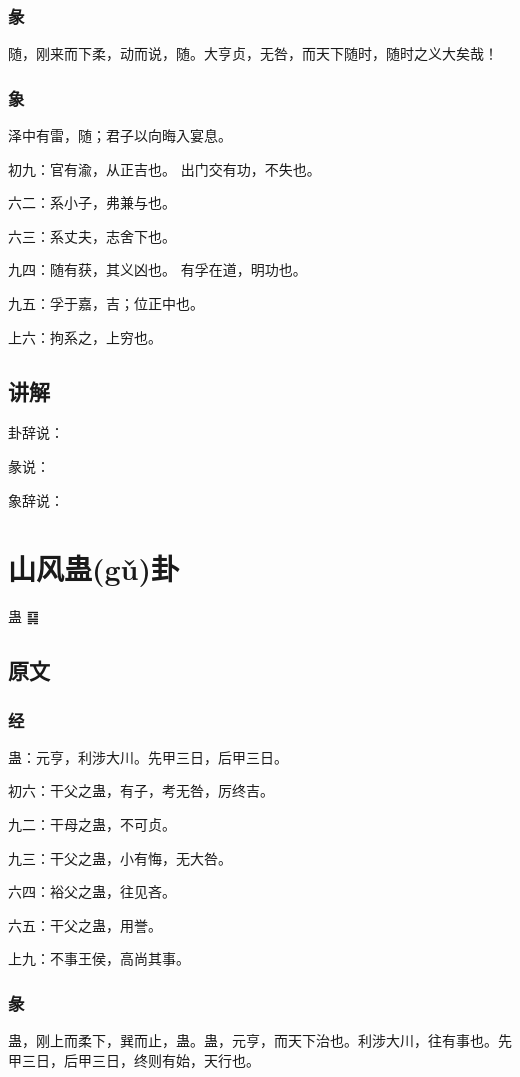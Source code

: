 \documentclass[12pt,oneside]{book}
\begin{document}
\subsection{彖}
随，刚来而下柔，动而说，随。大亨贞，无咎，而天下随时，随时之义大矣哉！

\subsection{象}
泽中有雷，随；君子以向晦入宴息。

初九：官有渝，从正吉也。 出门交有功，不失也。

六二：系小子，弗兼与也。

六三：系丈夫，志舍下也。

九四：随有获，其义凶也。 有孚在道，明功也。

九五：孚于嘉，吉；位正中也。

上六：拘系之，上穷也。

\section{讲解}
卦辞说：

彖说：

象辞说：



\chapter{山风蛊(gǔ)卦}
蛊 {\Large ䷑}

\section{原文}

\subsection{经}
蛊：元亨，利涉大川。先甲三日，后甲三日。

初六：干父之蛊，有子，考无咎，厉终吉。

九二：干母之蛊，不可贞。

九三：干父之蛊，小有悔，无大咎。

六四：裕父之蛊，往见吝。

六五：干父之蛊，用誉。

上九：不事王侯，高尚其事。

\subsection{彖}
蛊，刚上而柔下，巽而止，蛊。蛊，元亨，而天下治也。利涉大川，往有事也。先甲三日，后甲三日，终则有始，天行也。
\end{document}
